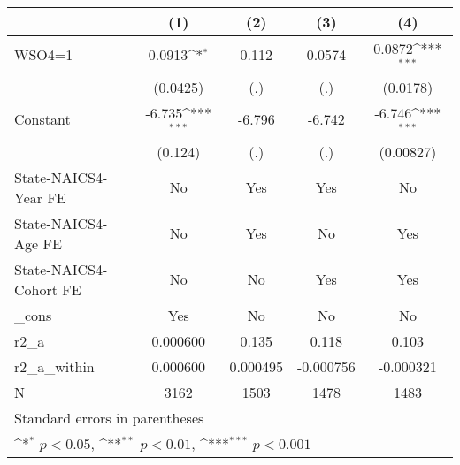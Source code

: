 {
\def\sym#1{\ifmmode^{#1}\else\(^{#1}\)\fi}
\begin{tabular}{l*{4}{c}}
\hline\hline
                    &\multicolumn{1}{c}{(1)}         &\multicolumn{1}{c}{(2)}         &\multicolumn{1}{c}{(3)}         &\multicolumn{1}{c}{(4)}         \\
\hline
WSO4=1              &      0.0913\sym{*}  &       0.112         &      0.0574         &      0.0872\sym{***}\\
                    &    (0.0425)         &         (.)         &         (.)         &    (0.0178)         \\
[1em]
Constant            &      -6.735\sym{***}&      -6.796         &      -6.742         &      -6.746\sym{***}\\
                    &     (0.124)         &         (.)         &         (.)         &   (0.00827)         \\
[1em]
State-NAICS4-Year FE&          No         &         Yes         &         Yes         &          No         \\
[1em]
State-NAICS4-Age FE &          No         &         Yes         &          No         &         Yes         \\
[1em]
State-NAICS4-Cohort FE&          No         &          No         &         Yes         &         Yes         \\
[1em]
\_cons              &         Yes         &          No         &          No         &          No         \\
\hline
r2\_a                &    0.000600         &       0.135         &       0.118         &       0.103         \\
r2\_a\_within         &    0.000600         &    0.000495         &   -0.000756         &   -0.000321         \\
N                   &        3162         &        1503         &        1478         &        1483         \\
\hline\hline
\multicolumn{5}{l}{\footnotesize Standard errors in parentheses}\\
\multicolumn{5}{l}{\footnotesize \sym{*} \(p<0.05\), \sym{**} \(p<0.01\), \sym{***} \(p<0.001\)}\\
\end{tabular}
}
